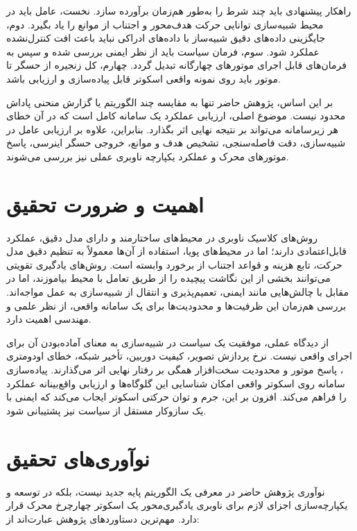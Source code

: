 راهکار پیشنهادی باید چند شرط را به‌طور هم‌زمان برآورده سازد. نخست، عامل باید در محیط شبیه‌سازی توانایی حرکت هدف‌محور و اجتناب از موانع را یاد بگیرد. دوم، جایگزینی داده‌های دقیق شبیه‌ساز با داده‌های ادراکی نباید باعث افت کنترل‌نشده عملکرد شود. سوم، فرمان سیاست باید از نظر ایمنی بررسی شده و سپس به فرمان‌های قابل اجرای موتورهای چهارگانه تبدیل گردد. چهارم، کل زنجیره از حسگر تا موتور باید روی نمونه واقعی اسکوتر قابل پیاده‌سازی و ارزیابی باشد.

بر این اساس، پژوهش حاضر تنها به مقایسه چند الگوریتم یا گزارش منحنی پاداش محدود نیست. موضوع اصلی، ارزیابی عملکرد یک سامانه کامل است که در آن خطای هر زیرسامانه می‌تواند بر نتیجه نهایی اثر بگذارد. بنابراین، علاوه بر ارزیابی عامل در شبیه‌سازی، دقت فاصله‌سنجی، تشخیص هدف و موانع، خروجی حسگر اینرسی، پاسخ موتورهای محرک و عملکرد یکپارچه ناوبری عملی نیز بررسی می‌شوند.

\section{اهمیت و ضرورت تحقیق}

روش‌های کلاسیک ناوبری در محیط‌های ساختارمند و دارای مدل دقیق، عملکرد قابل‌اعتمادی دارند؛ اما در محیط‌های پویا، استفاده از آن‌ها معمولاً به تنظیم دقیق مدل حرکت، تابع هزینه و قواعد اجتناب از برخورد وابسته است. روش‌های یادگیری تقویتی می‌توانند بخشی از این نگاشت پیچیده را از طریق تعامل با محیط بیاموزند، اما در مقابل با چالش‌هایی مانند ایمنی، تعمیم‌پذیری و انتقال از شبیه‌سازی به عمل مواجه‌اند. بررسی هم‌زمان این ظرفیت‌ها و محدودیت‌ها برای یک سامانه واقعی، از نظر علمی و مهندسی اهمیت دارد.

از دیدگاه عملی، موفقیت یک سیاست در شبیه‌سازی به معنای آماده‌بودن آن برای اجرای واقعی نیست. نرخ پردازش تصویر، کیفیت دوربین، تأخیر شبکه، خطای اودومتری%
، پاسخ موتور و محدودیت سخت‌افزار همگی بر رفتار نهایی اثر می‌گذارند. پیاده‌سازی سامانه روی اسکوتر واقعی امکان شناسایی این گلوگاه‌ها و ارزیابی واقع‌بینانه عملکرد را فراهم می‌کند. افزون بر این، جرم و توان حرکتی اسکوتر ایجاب می‌کند که ایمنی با یک سازوکار مستقل از سیاست نیز پشتیبانی شود.

\section{نوآوری‌های تحقیق}

نوآوری پژوهش حاضر در معرفی یک الگوریتم پایه جدید نیست، بلکه در توسعه و یکپارچه‌سازی اجزای لازم برای ناوبری یادگیری‌محور یک اسکوتر چهارچرخ محرک قرار دارد. مهم‌ترین دستاوردهای پژوهش عبارت‌اند از:

